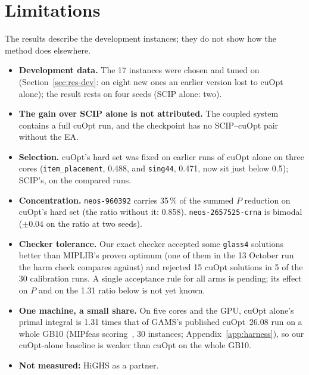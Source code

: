 \section{Limitations}\label{sec:limits}
The results describe the development instances; they do not show how the method does elsewhere.
\begin{itemize}
\item \textbf{Development data.} The 17 instances were chosen and tuned on (Section~\ref{sec:res-dev}: on eight new
  ones an earlier version lost to cuOpt alone); the result rests on four seeds (SCIP alone: two).
\item \textbf{The gain over SCIP alone is not attributed.} The coupled system contains a full cuOpt run, and the
  checkpoint has no SCIP--cuOpt pair without the EA.
\item \textbf{Selection.} cuOpt's hard set was fixed on earlier runs of cuOpt alone on three cores
  (\texttt{item\_placement}, 0.488, and \texttt{sing44}, 0.471, now sit just below 0.5); SCIP's, on the compared runs.
\item \textbf{Concentration.} \texttt{neos-960392} carries 35\,\% of the summed $P$ reduction on cuOpt's hard set
  (the ratio without it: 0.858). \texttt{neos-2657525-crna} is bimodal ($\pm 0.04$ on the ratio at two seeds).
\item \textbf{Checker tolerance.} Our exact checker accepted some \texttt{glass4} solutions better than MIPLIB's proven
  optimum (one of them in the 13 October run the harm check compares against) and rejected 15 cuOpt solutions in 5 of
  the 30 calibration runs. A single acceptance rule for all arms is pending; its effect on $P$ and on the 1.31 ratio
  below is not yet known.
\item \textbf{One machine, a small share.} On five cores and the GPU, cuOpt alone's primal integral is 1.31 times
  that of GAMS's published cuOpt~26.08 run on a whole GB10 (MIPfeas
  scoring~\citep{bussieck2026mipfeas,mittelmann2026mipfeas}, 30 instances; Appendix~\ref{app:harness}), so our
  cuOpt-alone baseline is weaker than cuOpt on the whole GB10.
\item \textbf{Not measured:} HiGHS as a partner.
\end{itemize}
\FloatBarrier
